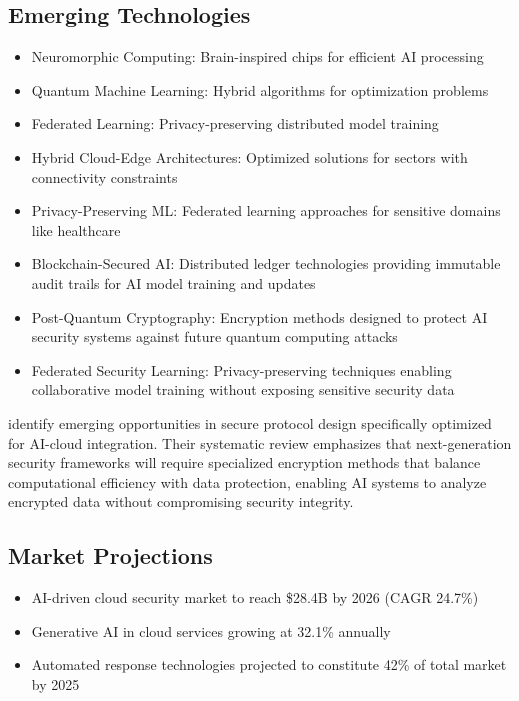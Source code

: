 \documentclass[a4paper,12pt]{article}
\begin{document}
\subsection{Emerging Technologies}
\begin{itemize}
    \item Neuromorphic Computing: Brain-inspired chips for efficient AI processing
    \item Quantum Machine Learning: Hybrid algorithms for optimization problems
    \item Federated Learning: Privacy-preserving distributed model training
    \item Hybrid Cloud-Edge Architectures: Optimized solutions for sectors with connectivity constraints
    \item Privacy-Preserving ML: Federated learning approaches for sensitive domains like healthcare
    \item Blockchain-Secured AI: Distributed ledger technologies providing immutable audit trails for AI model training and updates
    \item Post-Quantum Cryptography: Encryption methods designed to protect AI security systems against future quantum computing attacks
    \item Federated Security Learning: Privacy-preserving techniques enabling collaborative model training without exposing sensitive security data
\end{itemize}

\citet{alouffi2021} identify emerging opportunities in secure protocol design specifically optimized for AI-cloud integration. Their systematic review emphasizes that next-generation security frameworks will require specialized encryption methods that balance computational efficiency with data protection, enabling AI systems to analyze encrypted data without compromising security integrity.

\subsection{Market Projections}
\begin{itemize}
    \item AI-driven cloud security market to reach \$28.4B by 2026 (CAGR 24.7\%)
    \item Generative AI in cloud services growing at 32.1\% annually
    \item Automated response technologies projected to constitute 42\% of total market by 2025
\end{itemize}
\end{document}
